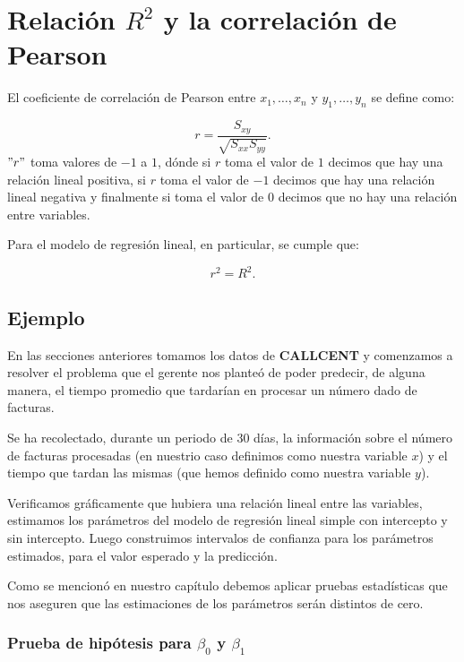 \documentclass[
  a4paper,
  oneside,
  openany]{book}
\begin{document}
\hypertarget{relaciuxf3n-r2-y-la-correlaciuxf3n-de-pearson}{%
\section{\texorpdfstring{Relación \(R^2\) y la correlación de Pearson}{Relación R\^{}2 y la correlación de Pearson}}\label{relaciuxf3n-r2-y-la-correlaciuxf3n-de-pearson}}

El coeficiente de correlación de Pearson entre \(x_{1},\ldots, x_{n}\) y \(y_{1},\ldots, y_{n}\) se define como:

\[r=\frac{S_{xy}}{\sqrt{S_{xx}S_{yy}}}.\]
\("r"\) toma valores de \(-1\) a \(1\), dónde si \(r\) toma el valor de \(1\) decimos que hay una relación lineal positiva, si \(r\) toma el valor de \(-1\) decimos que hay una relación lineal negativa y finalmente si toma el valor de \(0\) decimos que no hay una relación entre variables.

Para el modelo de regresión lineal, en particular, se cumple que:

\[r^2=R^2.\]

\hypertarget{ejemplo-18}{%
\subsection{Ejemplo}\label{ejemplo-18}}

En las secciones anteriores tomamos los datos de \textbf{CALLCENT} y comenzamos a resolver el problema que el gerente nos planteó de poder
predecir, de alguna manera, el tiempo promedio que tardarían en procesar un número dado de facturas.

Se ha recolectado, durante un periodo de 30 días, la información sobre el número de facturas procesadas (en nuestrio caso definimos como nuestra variable \(x\)) y el tiempo que tardan las mismas (que hemos definido como nuestra variable \(y\)).

Verificamos gráficamente que hubiera una relación lineal entre las variables, estimamos los parámetros del modelo de regresión lineal simple con intercepto y sin intercepto. Luego construimos intervalos de confianza para los parámetros estimados, para el valor esperado y la predicción.

Como se mencionó en nuestro capítulo debemos aplicar pruebas estadísticas que nos aseguren que las estimaciones de los parámetros serán distintos de cero.

\hypertarget{prueba-de-hipuxf3tesis-para-beta_0-y-beta_1}{%
\subsubsection*{\texorpdfstring{Prueba de hipótesis para \(\beta_{0}\) y \(\beta_{1}\)}{Prueba de hipótesis para \textbackslash beta\_\{0\} y \textbackslash beta\_\{1\}}}\label{prueba-de-hipuxf3tesis-para-beta_0-y-beta_1}}
\end{document}
